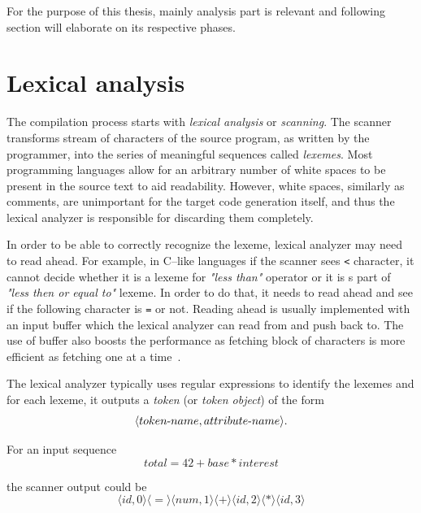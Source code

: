 \documentclass[
  digital, %
  table,   %
  lof,     %
  lot,     %
  oneside,
]{fithesis3}
\begin{document}
For the purpose of this thesis, mainly analysis part is relevant and following section will elaborate on its respective phases.

  \section{Lexical analysis}
The compilation process starts with \textit{lexical analysis} or \textit{scanning}. The scanner transforms stream of characters of the source program, as written by the programmer, into the series of meaningful sequences called \textit{lexemes}. Most programming languages allow for an arbitrary number of white spaces to be present in the source text to aid readability. However, white spaces, similarly as comments, are unimportant for the target code generation itself, and thus the lexical analyzer is responsible for discarding them completely.

In order to be able to correctly recognize the lexeme, lexical analyzer may need to read ahead. For example, in C--like languages if the scanner sees \texttt{<} character, it cannot decide whether it is a lexeme for \textit{"less than"} operator or it is s part of \textit{"less then or equal to"} lexeme. In order to do that, it needs to read ahead and see if the following character is \texttt{=} or not. Reading ahead is usually implemented with an input buffer which the lexical analyzer can read from and push back to. The use of buffer also boosts the performance as fetching block of characters is more efficient as fetching one at a time~\cite{dragon-book}.

The lexical analyzer typically uses regular expressions to identify the lexemes and for each lexeme, it outputs a \textit{token} (or \textit{token object}) of the form 
\begin{equation}
  \langle token \textnormal{-} name, attribute \textnormal{-} name \rangle \textnormal{.}
\end{equation}

\noindent
For an input sequence 
\begin{equation}
  total = 42 + base * interest
\end{equation}
 
the scanner output could be
\begin{equation}
  \langle id, 0 \rangle 
  \langle = \rangle 
  \langle num, 1 \rangle 
  \langle + \rangle 
  \langle id, 2 \rangle 
  \langle * \rangle 
  \langle id, 3 \rangle
\end{equation}
\end{document}
